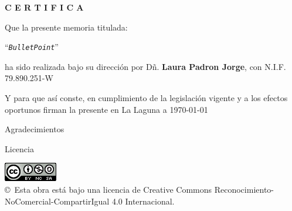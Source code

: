 \documentclass[spanish,a4paper,14pt,oneside]{extreport}
\newcommand{\BulletPoint}{\texttt{BulletPoint{}}}
\begin{document}
\bigskip

\bigskip
\bigskip
{\bf C E R T I F I C A}

\bigskip
\bigskip
\bigskip
Que la presente memoria titulada:

\bigskip
``{\it \BulletPoint{}}''

\bigskip
\bigskip
\bigskip
\noindent ha sido realizada bajo su dirección por Dñ. {\bf Laura Padron Jorge},
con N.I.F. 79.890.251-W

\bigskip
\bigskip

Y para que así conste, en cumplimiento de la legislación vigente y a los efectos
oportunos firman la presente en La Laguna a \today

\newpage
\thispagestyle{empty}

{ \flushright

\begin{LARGE}
Agradecimientos
\end{LARGE}

\hspace{3mm}

\begin{large}


\hspace{3mm}


\end{large}

}

\newpage

\begin{huge}
Licencia
\end{huge}

\bigskip

\begin{center}
\includegraphics[scale=1.5]{images/by-nc-sa_88x31}\\[10mm]
{\Large \copyright~Esta obra está bajo una licencia de Creative Commons Reconocimiento-NoComercial-CompartirIgual 4.0 Internacional.
}
\end{center}
\end{document}
